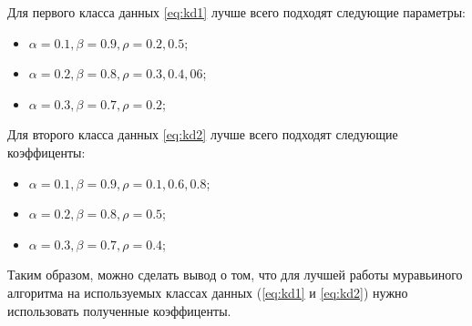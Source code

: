 Для первого класса данных \ref{eq:kd1} лучше всего подходят следующие параметры:
\begin{itemize}[label=---]
    \item $\alpha = 0.1, \beta = 0.9, \rho = 0.2, 0.5$;
    \item $\alpha = 0.2, \beta = 0.8, \rho = 0.3, 0.4, 06$;
    \item $\alpha = 0.3, \beta = 0.7, \rho = 0.2$;
\end{itemize}  

Для второго класса данных \ref{eq:kd2} лучше всего подходят следующие коэффиценты:
\begin{itemize}[label=---]
    \item $\alpha = 0.1, \beta = 0.9, \rho = 0.1, 0.6, 0.8$;
    \item $\alpha = 0.2, \beta = 0.8, \rho = 0.5$;
    \item $\alpha = 0.3, \beta = 0.7, \rho = 0.4$;
\end{itemize}  

Таким образом, можно сделать вывод о том, что для лучшей работы муравьиного алгоритма на используемых классах данных (\ref{eq:kd1} и \ref{eq:kd2}) нужно использовать полученные коэффиценты.

